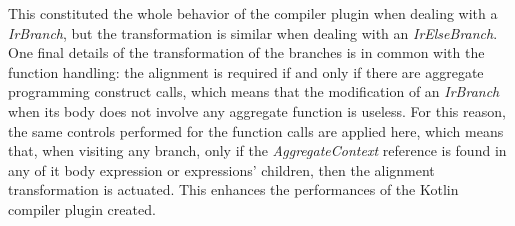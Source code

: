 This constituted the whole behavior of the compiler plugin when dealing with a \textit{IrBranch}, but the transformation is similar when dealing with an \textit{IrElseBranch}.\newline
One final details of the transformation of the branches is in common with the function handling: the alignment is required if and only if there are aggregate programming construct calls, which means that the modification of an \textit{IrBranch} when its body does not involve any aggregate function is useless.\newline
For this reason, the same controls performed for the function calls are applied here, which means that, when visiting any branch, only if the \textit{AggregateContext} reference is found in any of it body expression or expressions' children, then the alignment transformation is actuated. This enhances the performances of the Kotlin compiler plugin created.
